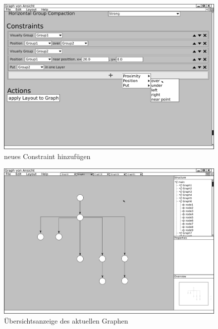 \begin{figure}[ht]
  \centering
  \includegraphics[width=380pt]{resourcen/gui_layoutsettings_constraints_new.png}
  \caption{neues Constraint hinzufügen}
  \label{fig:gui_layoutsettings_constraints_new}
\end{figure}

\begin{figure}[hb]
  \centering
  \includegraphics[width=380pt]{resourcen/gui_view_minimap.png}
  \caption{Übersichtsanzeige des aktuellen Graphen}
  \label{fig:gui_view_minimap}
\end{figure}


